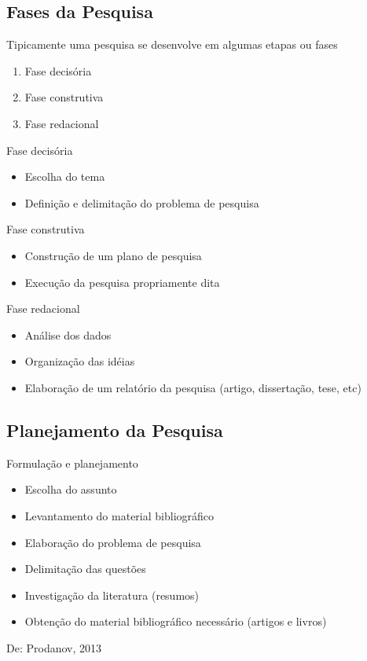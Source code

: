 \documentclass{beamer}
\begin{document}
\subsection{Fases da Pesquisa}

\begin{frame}
  Tipicamente uma pesquisa se desenvolve em algumas etapas ou fases
  \begin{enumerate}
  \item Fase decisória
  \item Fase construtiva
  \item Fase redacional
  \end{enumerate}
\end{frame}

\begin{frame}{Fase decisória}
  \begin{itemize}
  \item Escolha do tema
  \item Definição e delimitação do problema de pesquisa
  \end{itemize}
\end{frame}

\begin{frame}{Fase construtiva}
  \begin{itemize}
  \item Construção de um plano de pesquisa
  \item Execução da pesquisa propriamente dita
  \end{itemize}
\end{frame}

\begin{frame}{Fase redacional}
  \begin{itemize}
  \item Análise dos dados
  \item Organização das idéias
  \item Elaboração de um relatório da pesquisa (artigo, dissertação,
    tese, etc)
  \end{itemize}
\end{frame}

\subsection{Planejamento da Pesquisa}

\begin{frame}{Formulação e planejamento}
  \begin{itemize}
  \item Escolha do assunto
  \item Levantamento do material bibliográfico
  \item Elaboração do problema de pesquisa
  \item Delimitação das questões
  \item Investigação da literatura (resumos)
  \item Obtenção do material bibliográfico necessário (artigos e livros)
  \end{itemize}
  De: Prodanov, 2013
\end{frame}
\end{document}
